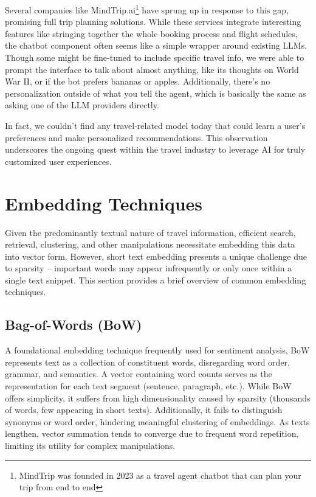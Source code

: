 \documentclass[12pt,a4paper]{report}
\begin{document}
Several companies like MindTrip.ai\footnote{MindTrip was founded in 2023 as a travel agent chatbot that can plan your trip from end to end} have sprung up in response to this gap, promising full trip planning solutions. While these services integrate interesting features like stringing together the whole booking process and flight schedules, the chatbot component often seems like a simple wrapper around existing LLMs. Though some might be fine-tuned to include specific travel info, we were able to prompt the interface to talk about almost anything, like its thoughts on World War II, or if the bot prefers bananas or apples. Additionally, there's no personalization outside of what you tell the agent, which is basically the same as asking one of the LLM providers directly.

In fact, we couldn't find any travel-related model today that could learn a user's preferences and make personalized recommendations. This observation underscores the ongoing quest within the travel industry to leverage AI for truly customized user experiences.



\section{Embedding Techniques}

Given the predominantly textual nature of travel information, efficient search, retrieval, clustering, and other manipulations necessitate embedding this data into vector form. However, short text embedding presents a unique challenge due to sparsity – important words may appear infrequently or only once within a single text snippet. This section provides a brief overview of common embedding techniques.


\subsection{Bag-of-Words (BoW)} A foundational embedding technique frequently used for sentiment analysis, BoW represents text as a collection of constituent words, disregarding word order, grammar, and semantics\citep{mikolov2013efficient}. A vector containing word counts serves as the representation for each text segment (sentence, paragraph, etc.). While BoW offers simplicity, it suffers from high dimensionality caused by sparsity (thousands of words, few appearing in short texts). Additionally, it fails to distinguish synonyms or word order, hindering meaningful clustering of embeddings. As texts lengthen, vector summation tends to converge due to frequent word repetition, limiting its utility for complex manipulations.
\end{document}
